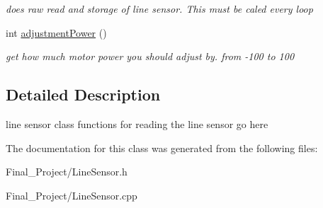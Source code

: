 \begin{DoxyCompactItemize}
\begin{DoxyCompactList}\small\item\em does raw read and storage of line sensor. This must be caled every loop \end{DoxyCompactList}\item 
\hypertarget{classLineSensor_a74c3c2d7a454aeacae90501670d01bdc}{int \hyperlink{classLineSensor_a74c3c2d7a454aeacae90501670d01bdc}{adjustment\-Power} ()}\label{classLineSensor_a74c3c2d7a454aeacae90501670d01bdc}

\begin{DoxyCompactList}\small\item\em get how much motor power you should adjust by. from -\/100 to 100 \end{DoxyCompactList}\end{DoxyCompactItemize}


\subsection{Detailed Description}
line sensor class functions for reading the line sensor go here 

The documentation for this class was generated from the following files\-:\begin{DoxyCompactItemize}
\item 
Final\-\_\-\-Project/Line\-Sensor.\-h\item 
Final\-\_\-\-Project/Line\-Sensor.\-cpp\end{DoxyCompactItemize}
